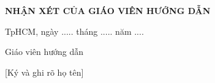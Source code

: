 \newpage
{}
{}
\begin{center}
\textbf{\Large NHẬN XÉT CỦA GIÁO VIÊN HƯỚNG DẪN }
\vspace{1cm}
\dotcolumnfill
\end{center}

\hspace{7cm}TpHCM, ngày ..... tháng ..... năm ....

\hspace{8.5cm}Giáo viên hướng dẫn

\hspace{8.5cm}[Ký và ghi rõ họ tên]